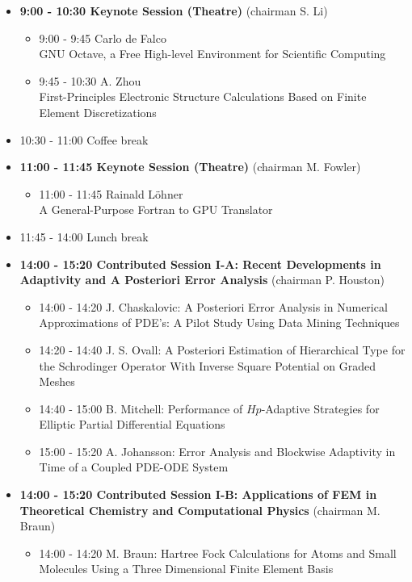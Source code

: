 \documentclass[10pt, A4]{article}%
\begin{document}
\begin{itemize}    
  \item {\bf 9:00 - 10:30 Keynote Session (Theatre)} (chairman S. Li) 
  \begin{itemize}
    \item 9:00 - 9:45 {Carlo de Falco}\\{GNU Octave, a Free High-level Environment for Scientific Computing}
    \item 9:45 - 10:30 {A. Zhou}\\{First-Principles Electronic Structure Calculations Based on Finite Element Discretizations}
  \end{itemize}
  \item 10:30 - 11:00 Coffee break
  \item {\bf 11:00 - 11:45 Keynote Session (Theatre)} (chairman M. Fowler)
  \begin{itemize}
    \item 11:00 - 11:45 {Rainald L\"{o}hner}\\A General-Purpose Fortran to GPU Translator
  \end{itemize}
  \item 11:45 - 14:00 Lunch break      
  \item {\bf 14:00 - 15:20 Contributed Session I-A: Recent Developments in Adaptivity and A Posteriori Error Analysis} (chairman P. Houston) 
  \begin{itemize}
    \item 14:00 - 14:20 {J. Chaskalovic}: {A Posteriori Error Analysis in Numerical Approximations of PDE's: A Pilot Study Using Data Mining Techniques} %
    \item 14:20 - 14:40 {J. S. Ovall}: {A Posteriori Estimation of Hierarchical Type for the  Schrodinger Operator With Inverse Square Potential on Graded Meshes}
    \item 14:40 - 15:00 {B. Mitchell}: {Performance of $Hp$-Adaptive Strategies for Elliptic Partial Differential Equations}
    \item 15:00 - 15:20 {A. Johansson}: {Error Analysis and Blockwise Adaptivity in Time of a Coupled PDE-ODE System} 
  \end{itemize}
  \item {\bf 14:00 - 15:20 Contributed Session I-B: Applications of FEM in Theoretical Chemistry and Computational Physics} (chairman M. Braun) 
  \begin{itemize}
    \item 14:00 - 14:20 {M. Braun}: {Hartree Fock Calculations for Atoms and Small Molecules Using  a Three Dimensional Finite Element Basis}

\end{itemize}
\end{itemize}
\end{document}
